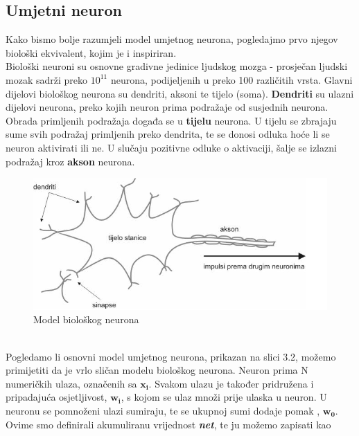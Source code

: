 \subsection{Umjetni neuron}

Kako bismo bolje razumjeli model umjetnog neurona, pogledajmo prvo njegov biološki ekvivalent, kojim je i inspiriran.\\

\noindent Biološki neuroni su osnovne gradivne jedinice ljudskog mozga - prosječan ljudski mozak sadrži preko $10^{11}$ neurona, podijeljenih u preko 100 različitih vrsta. Glavni dijelovi biološkog neurona su dendriti, aksoni te tijelo (soma). 
\textbf{Dendriti} su ulazni dijelovi neurona, preko kojih neuron prima podražaje od susjednih neurona. Obrada primljenih podražaja događa se u \textbf{tijelu} neurona. U tijelu se zbrajaju sume svih podražaj primljenih preko dendrita, te se donosi odluka hoće li se neuron aktivirati ili ne. U slučaju pozitivne odluke o aktivaciji, šalje se izlazni podražaj kroz \textbf{akson} neurona.\cite{uilectures}\cite{neuroninfo}


\begin{figure}[htb]
\centering
\includegraphics[width=12cm]{slike/bioloski_neuron.png}
\caption{Model biološkog neurona \citep{neuronskeMreze2008FER}}
\label{fig:fer-logo}
\end{figure}
\textbf{}
\\
Pogledamo li osnovni model umjetnog neurona, prikazan na slici 3.2, možemo primijetiti da je vrlo sličan modelu biološkog neurona. Neuron prima N numeričkih ulaza, označenih sa $\mathbf{x_{i}}$. Svakom ulazu je također pridružena i pripadajuća osjetljivost, $\mathbf{w_{i}}$, s kojom se ulaz množi prije ulaska u neuron. U neuronu se pomnoženi ulazi sumiraju, te se ukupnoj sumi dodaje pomak , $\mathbf{w_{0}}$. Ovime smo definirali akumuliranu vrijednost \textit{\textbf{net}}, te ju možemo zapisati kao


